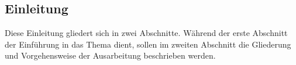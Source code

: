 \begin{newpage}
	\section{Einleitung}
	\label{sec:Einleitung}
		Diese Einleitung gliedert sich in zwei Abschnitte. Während der erste Abschnitt der Einführung in das Thema dient, sollen im zweiten Abschnitt die Gliederung und Vorgehensweise der Ausarbeitung beschrieben werden. 

		
		



\end{newpage}